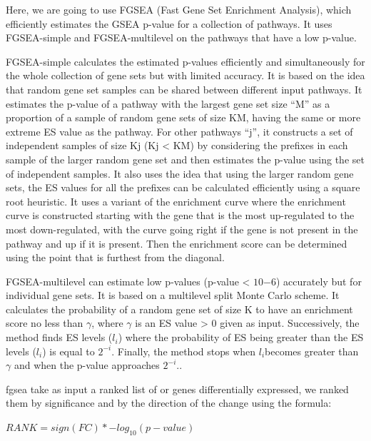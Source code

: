 \documentclass[a4paper, 11pt]{article}
\begin{document}
\begin{multicols}{2}
Here, we are going to use FGSEA (Fast Gene Set Enrichment Analysis), which efficiently estimates the GSEA p-value for a collection of pathways. It uses FGSEA-simple and FGSEA-multilevel on the pathways that have a low p-value.

FGSEA-simple calculates the estimated p-values efficiently and simultaneously for the whole collection of gene sets but with limited accuracy. It is based on the idea that random gene set samples can be shared between different input pathways. It estimates the p-value of a pathway with the largest gene set size “M” as a proportion of a sample of random gene sets of size KM, having the same or more extreme ES value as the pathway. For other pathways “j”, it constructs a set of independent samples of size Kj (Kj < KM) by considering the prefixes in each sample of the larger random gene set and then estimates the p-value using the set of independent samples. It also uses the idea that using the larger random gene sets, the ES values for all the prefixes can be calculated efficiently using a square root heuristic. It uses a variant of the enrichment curve where the enrichment curve is constructed starting with the gene that is the most up-regulated to the most down-regulated, with the curve going right if the gene is not present in the pathway and up if it is present. Then the enrichment score can be determined using the point that is furthest from the diagonal.

FGSEA-multilevel can estimate low p-values (p-value < $10{-6}$) accurately but for individual gene sets. It is based on a multilevel split Monte Carlo scheme. It calculates the probability of a random gene set of size K to have an enrichment score no less than $\gamma$, where $\gamma$ is an ES value > 0 given as input. Successively, the method finds ES levels ($l_i$) where the probability of ES being greater than the ES levels ($l_i$) is equal to $2^{-i}$. Finally, the method stops when $ l_i $becomes greater than $\gamma$ and when the p-value approaches $2^{-i}$.\citep{korotkevich2016fast}.

fgsea take as input a ranked list of or genes differentially expressed, we ranked them by significance and by the direction of the change using the formula:
\bigskip

 $ RANK =sign(FC)* -log_{10}(p-value)  $
\bigskip


\end{multicols}
\end{document}
